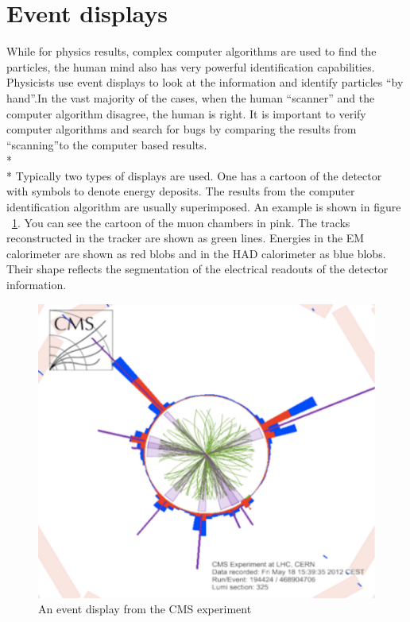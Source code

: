 \section{Event displays}
While for physics results, complex computer algorithms are used to find the particles, the human mind also has very powerful identification capabilities.  Physicists use event displays to look at the information and identify particles ``by hand''.In the vast majority of the cases, when the human ``scanner'' and the computer algorithm disagree, the human is right.  It is important to verify computer algorithms and search for bugs by comparing the results from ``scanning''to the computer based results.
\\*
\\*
Typically two types of displays are used.  One has a cartoon of the detector with symbols to denote energy deposits.  The results from the computer identification algorithm are usually superimposed.  An example is shown in figure ~\ref{fig:pid2}.  You can see the cartoon of the muon chambers in pink.  The tracks reconstructed in the tracker are shown as green lines.  Energies in the EM calorimeter are shown as red blobs and in the HAD calorimeter as blue blobs.  Their shape reflects the segmentation of the electrical readouts of the detector information.
\begin{figure}[h]
\centering\includegraphics[scale=0.5]{./particleID/Pictures/fig2.pdf}
\caption{An event display from the CMS experiment}
\label{fig:pid2}
\end{figure}
